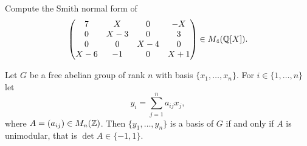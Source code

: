 \begin{exercise}
	\label{xca:Smith_Q[X]}
	Compute the Smith normal form of
	\[
		\begin{pmatrix}
			7 & X & 0 & -X \\
			0 & X-3 & 0 & 3\\
			0 & 0 & X-4 & 0 \\
			X-6 & -1 & 0 & X+1 
		\end{pmatrix}\in M_4(\mathbb{Q}[X]).
	\]
\end{exercise}

\begin{exercise}
\label{xca:unimodular}
    Let $G$ be a free abelian group of rank $n$ with basis $\{x_1,\dots,x_n\}$.
    For $i\in\{1,\dots,n\}$ let 
    \[
    y_i=\sum_{j=1}^n a_{ij}x_j,
    \]
    where $A=(a_{ij})\in M_n(\mathbb{Z})$. Then $\{y_1,\dots,y_n\}$ is a basis of $G$ 
    if and only if $A$ is unimodular, that is $\det A\in\{-1,1\}$. 
\end{exercise}

